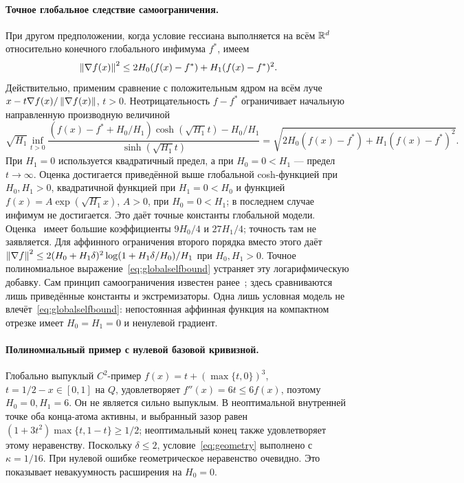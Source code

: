 \paragraph{Точное глобальное следствие самоограничения.}
При другом предположении, когда условие гессиана выполняется на всём
$\mathbb R^d$ относительно конечного глобального инфимума $f^*$, имеем
\begin{equation}\label{eq:globalselfbound}
 \left\|\nabla f(x)\right\|^2\le2H_0(f(x)-f^*)+H_1(f(x)-f^*)^2.
\end{equation}
Действительно, применим сравнение с положительным ядром на всём луче
$x-t\nabla f(x)/\left\|\nabla f(x)\right\|$, $t>0$.
Неотрицательность $f-f^*$ ограничивает начальную направленную
производную величиной
\[
 \sqrt{H_1}\inf_{t>0}
 \frac{(f(x)-f^*+H_0/H_1)\cosh(\sqrt{H_1}t)-H_0/H_1}
 {\sinh(\sqrt{H_1}t)}
 =\sqrt{2H_0(f(x)-f^*)+H_1(f(x)-f^*)^2}.
\]
При $H_1=0$ используется квадратичный предел, а при $H_0=0<H_1$
— предел $t\to\infty$. Оценка достигается приведённой выше
глобальной cosh-функцией при $H_0,H_1>0$, квадратичной функцией
при $H_1=0<H_0$ и функцией $f(x)=A\exp(\sqrt{H_1}x)$,
$A>0$, при $H_0=0<H_1$; в последнем случае инфимум не достигается.
Это даёт точные константы глобальной модели.
Оценка~\cite[приложение G, лемма 6]{warmup} имеет большие
коэффициенты $9H_0/4$ и $27H_1/4$; точность там не заявляется.
Для аффинного ограничения второго порядка
\cite[следствие 1]{caoselfbound} вместо этого даёт
$\left\|\nabla f\right\|^2\le2(H_0+H_1\delta)^2
\log(1+H_1\delta/H_0)/H_1$ при $H_0,H_1>0$.
Точное полиномиальное выражение~\eqref{eq:globalselfbound} устраняет
эту логарифмическую добавку. Сам принцип самоограничения известен
ранее~\cite[лемма 11]{kale}; здесь сравниваются лишь приведённые
константы и экстремизаторы. Одна лишь условная модель не
влечёт~\eqref{eq:globalselfbound}: непостоянная аффинная функция на
компактном отрезке имеет $H_0=H_1=0$ и ненулевой градиент.

\paragraph{Полиномиальный пример с нулевой базовой кривизной.}
Глобально выпуклый $C^2$-пример $f(x)=t+(\max\{t,0\})^3$,
$t=1/2-x\in[0,1]$ на $Q$, удовлетворяет
$f''(x)=6t\le6f(x)$, поэтому $H_0=0,H_1=6$.
Он не является сильно выпуклым. В неоптимальной внутренней точке
оба конца-атома активны, и выбранный зазор равен
$(1+3t^2)\max\{t,1-t\}\ge1/2$; неоптимальный конец также
удовлетворяет этому неравенству. Поскольку $\delta\le2$,
условие~\eqref{eq:geometry} выполнено с $\kappa=1/16$.
При нулевой ошибке геометрическое неравенство очевидно.
Это показывает невакуумность расширения на $H_0=0$.

